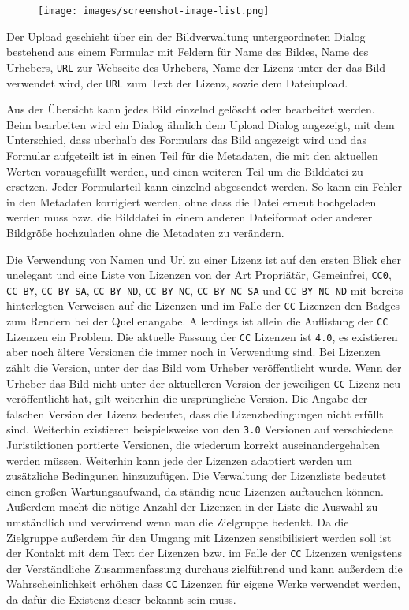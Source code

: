 \begin{figure}
  \centering
  \texttt{[image: images/screenshot-image-list.png]}
\end{figure}

Der Upload geschieht über ein der Bildverwaltung untergeordneten Dialog
bestehend aus einem Formular mit Feldern für Name des Bildes, Name des Urhebers,
\texttt{URL} zur Webseite des Urhebers, Name der Lizenz unter der das Bild
verwendet wird, der \texttt{URL} zum Text der Lizenz, sowie dem Dateiupload.

Aus der Übersicht kann jedes Bild einzelnd gelöscht oder bearbeitet werden. Beim
bearbeiten wird ein Dialog ähnlich dem Upload Dialog angezeigt, mit dem
Unterschied, dass uberhalb des Formulars das Bild angezeigt wird und das
Formular aufgeteilt ist in einen Teil für die Metadaten, die mit den aktuellen
Werten vorausgefüllt werden, und einen weiteren Teil um die Bilddatei zu
ersetzen. Jeder Formularteil kann einzelnd abgesendet werden. So kann ein Fehler
in den Metadaten korrigiert werden, ohne dass die Datei erneut hochgeladen
werden muss bzw. die Bilddatei in einem anderen Dateiformat oder anderer
Bildgröße hochzuladen ohne die Metadaten zu verändern.

Die Verwendung von Namen und Url zu einer Lizenz ist auf den ersten Blick eher
unelegant und eine Liste von Lizenzen von der Art Propriätär, Gemeinfrei,
\texttt{CC0}, \texttt{CC-BY}, \texttt{CC-BY-SA}, \texttt{CC-BY-ND},
\texttt{CC-BY-NC}, \texttt{CC-BY-NC-SA} und \texttt{CC-BY-NC-ND} mit bereits
hinterlegten Verweisen auf die Lizenzen und im Falle der \texttt{CC} Lizenzen
den Badges zum Rendern bei der Quellenangabe. Allerdings ist allein die
Auflistung der \texttt{CC} Lizenzen ein Problem. Die aktuelle Fassung der
\texttt{CC} Lizenzen ist \texttt{4.0}, es existieren aber noch ältere Versionen
die immer noch in Verwendung sind. Bei Lizenzen zählt die Version, unter der das
Bild vom Urheber veröffentlicht wurde. Wenn der Urheber das Bild nicht unter der
aktuelleren Version der jeweiligen \texttt{CC} Lizenz neu veröffentlicht hat,
gilt weiterhin die ursprüngliche Version. Die Angabe der falschen Version der
Lizenz bedeutet, dass die Lizenzbedingungen nicht erfüllt sind. Weiterhin
existieren beispielsweise von den \texttt{3.0} Versionen auf verschiedene
Juristiktionen portierte Versionen, die wiederum korrekt auseinandergehalten
werden müssen. Weiterhin kann jede der Lizenzen adaptiert werden um zusätzliche
Bedingunen hinzuzufügen. Die Verwaltung der Lizenzliste bedeutet einen großen
Wartungsaufwand, da ständig neue Lizenzen auftauchen können. Außerdem macht die
nötige Anzahl der Lizenzen in der Liste die Auswahl zu umständlich und
verwirrend wenn man die Zielgruppe bedenkt. Da die Zielgruppe außerdem für den
Umgang mit Lizenzen sensibilisiert werden soll ist der Kontakt mit dem Text der
Lizenzen bzw. im Falle der \texttt{CC} Lizenzen wenigstens der Verständliche
Zusammenfassung durchaus zielführend und kann außerdem die Wahrscheinlichkeit
erhöhen dass \texttt{CC} Lizenzen für eigene Werke verwendet werden, da dafür
die Existenz dieser bekannt sein muss.

